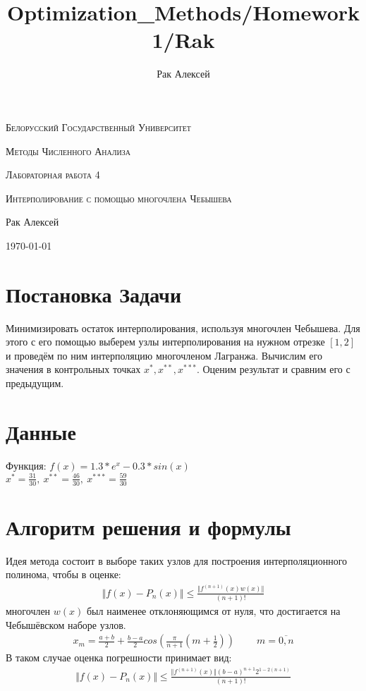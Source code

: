 \documentclass[10pt]{scrartcl}
\begin{document}
\author{Рак Алексей}
\title{Optimization_Methods/Homework1/Rak}
\begin{titlepage}
		\centering
		{\scshape\LARGE Белорусский Государственный Университет \par}
        \vfill
        {\scshape\LARGE Методы Численного Анализа\par}
        \vspace{1cm}
        {\scshape\LARGE Лабораторная работа 4\par}
        \vspace{1cm}
        {\scshape\LARGE Интерполирование с помощью многочлена Чебышева\par}
        \vspace{2cm}
        {\LARGE Рак Алексей\par}
        \vfill
        {\large \today}
\end{titlepage}
\section*{Постановка Задачи}\noindent
Минимизировать остаток интерполирования, используя многочлен Чебышева. Для этого с его помощью выберем узлы
интерполирования на нужном отрезке $[1, 2]$ и проведём по ним интерполяцию многочленом Лагранжа. Вычислим его 
значения в контрольных точках $x^*, x^{**}, x^{***}$. Оценим результат и сравним его с предыдущим.
\section*{Данные}\noindent
Функция: $f(x) = 1.3 * e^x - 0.3 * sin(x)$\\
$x^{*} = \frac{31}{30}, \ x^{**} = \frac{46}{30}, \ x^{***} = \frac{59}{30}$
\section*{Алгоритм решения и формулы}\noindent
Идея метода состоит в выборе таких узлов для построения интерполяционного полинома, чтобы в оценке:
\begin{gather*}
\Vert f(x) - P_n(x) \Vert \leq \frac{\Vert f^{(n + 1)}(x)w(x)\Vert}{(n+1)!}
\end{gather*}
многочлен $w(x)$ был наименее отклоняющимся от нуля, что достигается на Чебышёвском наборе узлов.
\begin{gather*}
x_m = \frac{a + b}{2} + \frac{b - a}{2}cos\left(\frac{\pi}{n + 1}\left(m + \frac{1}{2}\right)\right)
\ \ \ \ \ \ \ \ \ \ m = \overline{0, n}
\end{gather*}
В таком случае оценка погрешности принимает вид:
\begin{gather*}
\Vert f(x) - P_n(x)\Vert \leq \frac{\Vert f^{(n + 1)}(x)\Vert(b - a)^{n + 1}2^{1 - 2(n + 1)}}{(n + 1)!}
\end{gather*}
\end{document}
